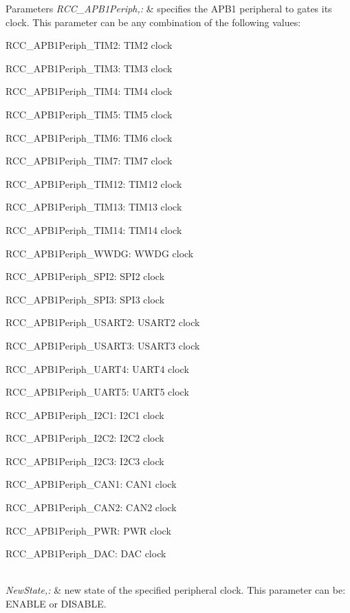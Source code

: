 \begin{DoxyParams}{Parameters}
{\em R\-C\-C\-\_\-\-A\-P\-B1\-Periph,\-:} & specifies the A\-P\-B1 peripheral to gates its clock. This parameter can be any combination of the following values\-: \begin{DoxyItemize}
\item R\-C\-C\-\_\-\-A\-P\-B1\-Periph\-\_\-\-T\-I\-M2\-: T\-I\-M2 clock \item R\-C\-C\-\_\-\-A\-P\-B1\-Periph\-\_\-\-T\-I\-M3\-: T\-I\-M3 clock \item R\-C\-C\-\_\-\-A\-P\-B1\-Periph\-\_\-\-T\-I\-M4\-: T\-I\-M4 clock \item R\-C\-C\-\_\-\-A\-P\-B1\-Periph\-\_\-\-T\-I\-M5\-: T\-I\-M5 clock \item R\-C\-C\-\_\-\-A\-P\-B1\-Periph\-\_\-\-T\-I\-M6\-: T\-I\-M6 clock \item R\-C\-C\-\_\-\-A\-P\-B1\-Periph\-\_\-\-T\-I\-M7\-: T\-I\-M7 clock \item R\-C\-C\-\_\-\-A\-P\-B1\-Periph\-\_\-\-T\-I\-M12\-: T\-I\-M12 clock \item R\-C\-C\-\_\-\-A\-P\-B1\-Periph\-\_\-\-T\-I\-M13\-: T\-I\-M13 clock \item R\-C\-C\-\_\-\-A\-P\-B1\-Periph\-\_\-\-T\-I\-M14\-: T\-I\-M14 clock \item R\-C\-C\-\_\-\-A\-P\-B1\-Periph\-\_\-\-W\-W\-D\-G\-: W\-W\-D\-G clock \item R\-C\-C\-\_\-\-A\-P\-B1\-Periph\-\_\-\-S\-P\-I2\-: S\-P\-I2 clock \item R\-C\-C\-\_\-\-A\-P\-B1\-Periph\-\_\-\-S\-P\-I3\-: S\-P\-I3 clock \item R\-C\-C\-\_\-\-A\-P\-B1\-Periph\-\_\-\-U\-S\-A\-R\-T2\-: U\-S\-A\-R\-T2 clock \item R\-C\-C\-\_\-\-A\-P\-B1\-Periph\-\_\-\-U\-S\-A\-R\-T3\-: U\-S\-A\-R\-T3 clock \item R\-C\-C\-\_\-\-A\-P\-B1\-Periph\-\_\-\-U\-A\-R\-T4\-: U\-A\-R\-T4 clock \item R\-C\-C\-\_\-\-A\-P\-B1\-Periph\-\_\-\-U\-A\-R\-T5\-: U\-A\-R\-T5 clock \item R\-C\-C\-\_\-\-A\-P\-B1\-Periph\-\_\-\-I2\-C1\-: I2\-C1 clock \item R\-C\-C\-\_\-\-A\-P\-B1\-Periph\-\_\-\-I2\-C2\-: I2\-C2 clock \item R\-C\-C\-\_\-\-A\-P\-B1\-Periph\-\_\-\-I2\-C3\-: I2\-C3 clock \item R\-C\-C\-\_\-\-A\-P\-B1\-Periph\-\_\-\-C\-A\-N1\-: C\-A\-N1 clock \item R\-C\-C\-\_\-\-A\-P\-B1\-Periph\-\_\-\-C\-A\-N2\-: C\-A\-N2 clock \item R\-C\-C\-\_\-\-A\-P\-B1\-Periph\-\_\-\-P\-W\-R\-: P\-W\-R clock \item R\-C\-C\-\_\-\-A\-P\-B1\-Periph\-\_\-\-D\-A\-C\-: D\-A\-C clock \end{DoxyItemize}
\\
\hline
{\em New\-State,\-:} & new state of the specified peripheral clock. This parameter can be\-: E\-N\-A\-B\-L\-E or D\-I\-S\-A\-B\-L\-E. \\
\hline
\end{DoxyParams}

